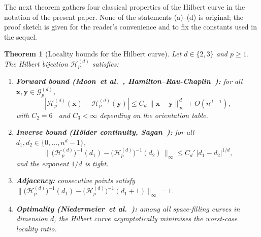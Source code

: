 \documentclass[11pt,a4paper]{article}
\theoremstyle{plain}
\newtheorem{theorem}{Theorem}[section]
\theoremstyle{definition}
\theoremstyle{remark}
\newcommand{\Hil}{\mathcal{H}}
\newcommand{\Grid}{\mathcal{G}}
\begin{document}
The next theorem gathers four classical properties of the Hilbert curve
in the notation of the present paper. None of the statements (a)--(d)
is original; the proof sketch is given for the reader's convenience and
to fix the constants used in the sequel.

\begin{theorem}[Locality bounds for the Hilbert curve]\label{thm:locality}
Let $d\in\{2,3\}$ and $p\geq 1$. The Hilbert bijection $\Hil_p^{(d)}$
satisfies:
\begin{enumerate}[label=(\alph*),nosep]
\item \textbf{Forward bound (Moon~\textit{et al.}~\cite{moon2001}, Hamilton--Rau-Chaplin~\cite{hamilton2008}):}
for all $\mathbf{x},\mathbf{y}\in\Grid_p^{(d)}$,
\[
|\Hil_p^{(d)}(\mathbf{x})-\Hil_p^{(d)}(\mathbf{y})|
\leq C_d\,\|\mathbf{x}-\mathbf{y}\|_\infty^{\,d} + O(n^{d-1}),
\]
with $C_2 = 6$~\cite{moon2001} and $C_3 < \infty$ depending on the
orientation table.
\item \textbf{Inverse bound (H\"older continuity, Sagan~\cite[Ch.~6]{sagan1994}):}
for all $d_1,d_2\in\{0,\dots,n^d-1\}$,
\[
\|\,\bigl(\Hil_p^{(d)}\bigr)^{-1}(d_1) - \bigl(\Hil_p^{(d)}\bigr)^{-1}(d_2)\,\|_\infty
\leq C_d'\, |d_1-d_2|^{1/d},
\]
and the exponent $1/d$ is tight.
\item \textbf{Adjacency:} consecutive points satisfy
$\|\bigl(\Hil_p^{(d)}\bigr)^{-1}(d_1) - \bigl(\Hil_p^{(d)}\bigr)^{-1}(d_1+1)\|_\infty = 1$.
\item \textbf{Optimality (Niedermeier~\textit{et al.}~\cite{niedermeier2002}):}
among all space-filling curves in dimension $d$, the Hilbert curve
asymptotically minimises the worst-case locality ratio.
\end{enumerate}
\end{theorem}
\end{document}
